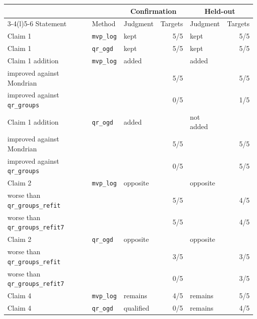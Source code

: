 \begin{tabular}{@{}lllrlr@{}}
\toprule
 & & \multicolumn{2}{c}{Confirmation} & \multicolumn{2}{c}{Held-out} \\
\cmidrule(lr){3-4}\cmidrule(l){5-6}
Statement & Method & Judgment & Targets & Judgment & Targets \\
\midrule
Claim 1 & \texttt{mvp\_log} & kept & 5/5 & kept & 5/5 \\
Claim 1 & \texttt{qr\_ogd} & kept & 5/5 & kept & 5/5 \\
Claim 1 addition & \texttt{mvp\_log} & added &  & added &  \\
\quad improved against Mondrian & &  & 5/5 &  & 5/5 \\
\quad improved against \texttt{qr\_groups} & &  & 0/5 &  & 1/5 \\
Claim 1 addition & \texttt{qr\_ogd} & added &  & not added &  \\
\quad improved against Mondrian & &  & 5/5 &  & 5/5 \\
\quad improved against \texttt{qr\_groups} & &  & 0/5 &  & 5/5 \\
Claim 2 & \texttt{mvp\_log} & opposite &  & opposite &  \\
\quad worse than \texttt{qr\_groups\_refit} & &  & 5/5 &  & 4/5 \\
\quad worse than \texttt{qr\_groups\_refit7} & &  & 5/5 &  & 4/5 \\
Claim 2 & \texttt{qr\_ogd} & opposite &  & opposite &  \\
\quad worse than \texttt{qr\_groups\_refit} & &  & 3/5 &  & 3/5 \\
\quad worse than \texttt{qr\_groups\_refit7} & &  & 0/5 &  & 3/5 \\
Claim 4 & \texttt{mvp\_log} & remains & 4/5 & remains & 5/5 \\
Claim 4 & \texttt{qr\_ogd} & qualified & 0/5 & remains & 4/5 \\
\bottomrule
\end{tabular}
